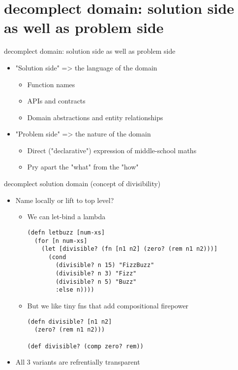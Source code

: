 \documentclass[presentation]{beamer}
\begin{document}
\section{decomplect domain: solution side as well as problem side}
\label{sec:orgac55a0f}
\begin{frame}[label={sec:org4be9531}]{decomplect domain: solution side as well as problem side}
\begin{itemize}
\item "Solution side" => the language of the domain
\begin{itemize}
\item Function names
\item APIs and contracts
\item Domain abstractions and entity relationships
\end{itemize}
\item "Problem side" => the nature of the domain
\begin{itemize}
\item Direct ("declarative") expression of middle-school maths
\item Pry apart the "what" from the "how"
\end{itemize}
\end{itemize}
\end{frame}
\begin{frame}[label={sec:org4627a71},fragile]{decomplect solution domain (concept of divisibility)}
 \begin{itemize}
\item Name locally or lift to top level?
\begin{itemize}
\item We can let-bind a lambda
\begin{verbatim}
(defn letbuzz [num-xs]
  (for [n num-xs]
    (let [divisible? (fn [n1 n2] (zero? (rem n1 n2)))]
      (cond
        (divisible? n 15) "FizzBuzz"
        (divisible? n 3) "Fizz"
        (divisible? n 5) "Buzz"
        :else n))))
\end{verbatim}
\item But we like tiny fns that add compositional firepower
\begin{verbatim}
(defn divisible? [n1 n2]
  (zero? (rem n1 n2)))

(def divisible? (comp zero? rem))
\end{verbatim}
\end{itemize}
\item All 3 variants are refrentially transparent
\end{itemize}
\end{frame}
\end{document}

